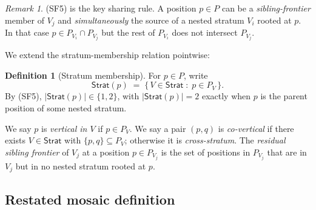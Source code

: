 \documentclass[11pt]{article}
\theoremstyle{definition}
\newtheorem{definition}[theorem]{Definition}
\theoremstyle{remark}
\newtheorem{remark}[theorem]{Remark}
\newcommand{\Stratum}{\mathsf{Strat}}
\begin{document}
\begin{remark}
(SF5) is the key sharing rule.  A position $p\in P$ can be a
\emph{sibling-frontier} member of $V_j$ and \emph{simultaneously} the
source of a nested stratum $V_i$ rooted at $p$.  In that case
$p\in P_{V_i}\cap P_{V_j}$ but the rest of $P_{V_i}$ does not
intersect $P_{V_j}$.
\end{remark}

We extend the stratum-membership relation pointwise:

\begin{definition}[Stratum membership]\label{def:stratum-mem}
For $p\in P$, write
\[
  \Stratum(p)\;=\;\{\,V\in\Stratum\;:\;p\in P_V\,\}.
\]
By (SF5), $|\Stratum(p)|\in\{1,2\}$, with $|\Stratum(p)|=2$ exactly
when $p$ is the parent position of some nested stratum.

We say $p$ is \emph{vertical in $V$} if $p\in P_V$.  We say a pair
$(p,q)$ is \emph{co-vertical} if there exists $V\in\Stratum$ with
$\{p,q\}\subseteq P_V$; otherwise it is \emph{cross-stratum}.  The
\emph{residual sibling frontier} of $V_j$ at a position $p\in P_{V_j}$
is the set of positions in $P_{V_j}$ that are in $V_j$ but in no
nested stratum rooted at $p$.
\end{definition}

\subsection{Restated mosaic definition}
\end{document}
